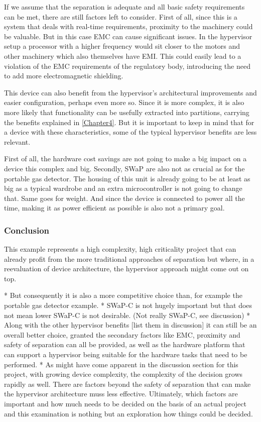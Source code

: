 If we assume that the separation is adequate and all basic safety requirements can be met, there are still factors left to consider. First of all, since this is a system that deals with real-time requirements, proximity to the machinery could be valuable. But in this case \gls{EMC} can cause significant issues. In the hypervisor setup a processor with a higher frequency would sit closer to the motors and other machinery which also themselves have \gls{EMI}. This could easily lead to a violation of the \gls{EMC} requirements of the regulatory body, introducing the need to add more electromagnetic shielding. 

This device can also benefit from the hypervisor's architectural improvements and easier configuration, perhaps even more so. Since it is more complex, it is also more likely that functionality can be usefully extracted into partitions, carrying the benefits explained in \ref{Chapter4}. But it is important to keep in mind that for a device with these characteristics, some of the typical hypervisor benefits are less relevant.

First of all, the hardware cost savings are not going to make a big impact on a device this complex and big. Secondly, \gls{SWaP} are also not as crucial as for the portable gas detector. The housing of this unit is already going to be at least as big as a typical wardrobe and an extra microcontroller is not going to change that. Same goes for weight. And since the device is connected to power all the time, making it as power efficient as possible is also not a primary goal.

\subsubsection{Conclusion}
This example represents a high complexity, high criticality project that can already profit from the more traditional approaches of separation but where, in a reevaluation of device architecture, the hypervisor approach might come out on top. 

* But consequently it is also a more competitive choice than, for example the portable gas detector example.
* SWaP-C is not hugely important but that does not mean lower SWaP-C is not desirable. (Not really SWaP-C, see discussion)
* Along with the other hypervisor benefits [list them in discussion] it can still be an overall better choice, granted the secondary factors like EMC, proximity and safety of separation can all be provided, as well as the hardware platform that can support a hypervisor being suitable for the hardware tasks that need to be performed.
* As might have come apparent in the discussion section for this project, with growing device complexity, the complexity of the decision grows rapidly as well. There are factors beyond the safety of separation that can make the hypervisor architecture muss less effective. Ultimately, which factors are important and how much needs to be decided on the basis of an actual project and this examination is nothing but an exploration how things could be decided.

